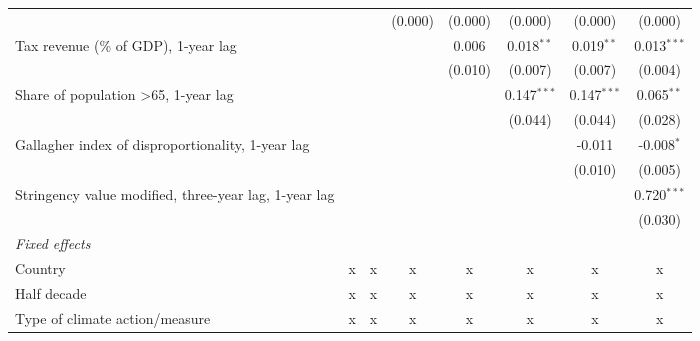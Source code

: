 \begin{tabular}{lccccccc}
                                                                   &               &               & (0.000)      & (0.000)     & (0.000)       & (0.000)       & (0.000)\\   
   Tax revenue (\% of GDP), 1-year lag                             &               &               &              & 0.006       & 0.018$^{**}$  & 0.019$^{**}$  & 0.013$^{***}$\\   
                                                                   &               &               &              & (0.010)     & (0.007)       & (0.007)       & (0.004)\\   
   Share of population >65, 1-year lag                             &               &               &              &             & 0.147$^{***}$ & 0.147$^{***}$ & 0.065$^{**}$\\   
                                                                   &               &               &              &             & (0.044)       & (0.044)       & (0.028)\\   
   Gallagher index of disproportionality, 1-year lag               &               &               &              &             &               & -0.011        & -0.008$^{*}$\\   
                                                                   &               &               &              &             &               & (0.010)       & (0.005)\\   
   Stringency value modified, three-year lag, 1-year lag           &               &               &              &             &               &               & 0.720$^{***}$\\   
                                                                   &               &               &              &             &               &               & (0.030)\\   
   \emph{Fixed effects}\\
   Country                                                         & x             & x             & x            & x           & x             & x             & x\\  
   Half decade                                                     & x             & x             & x            & x           & x             & x             & x\\  
   Type of climate action/measure                                  & x             & x             & x            & x           & x             & x             & x\\  

\end{tabular}
